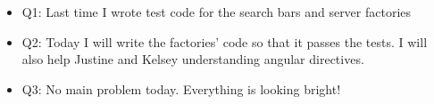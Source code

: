 \documentclass[]{article}
\begin{document}
\begin{itemize}
\begin{itemize}
    \begin{itemize}
    \itemsep1pt\parskip0pt
    \item
      Q1: Last time I wrote test code for the search bars and server
      factories
    \item
      Q2: Today I will write the factories' code so that it passes the
      tests. I will also help Justine and Kelsey understanding angular
      directives.
    \item
      Q3: No main problem today. Everything is looking bright!
    \end{itemize}
  \end{itemize}
\end{itemize}
\end{document}
